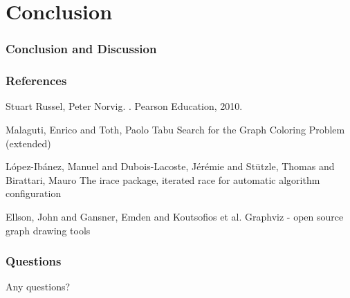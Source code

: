 \documentclass{beamer}
\begin{document}

  \section{Conclusion}
  \begin{frame}
    \frametitle{Conclusion and Discussion}


  \end{frame}





\begin{frame}
  \frametitle<presentation>{References}    
  \begin{thebibliography}{3}

    \beamertemplatebookbibitems
    Stuart Russel, Peter Norvig.
    .
    \newblock Pearson Education, 2010.

    
  \beamertemplatearticlebibitems
    Malaguti, Enrico and Toth, Paolo
    \newblock Tabu Search for the Graph Coloring Problem (extended)


    L{\'o}pez-Ib{\'a}nez, Manuel and Dubois-Lacoste, J{\'e}r{\'e}mie and St{\"u}tzle, Thomas and Birattari, Mauro
    \newblock The irace package, iterated race for automatic algorithm configuration


Ellson, John and Gansner, Emden and Koutsofios et al.
    \newblock Graphviz - open source graph drawing tools
    
  \end{thebibliography}
\end{frame}

\begin{frame}
\frametitle{Questions}
\centerline{Any questions?}
\end{frame}
\end{document}
